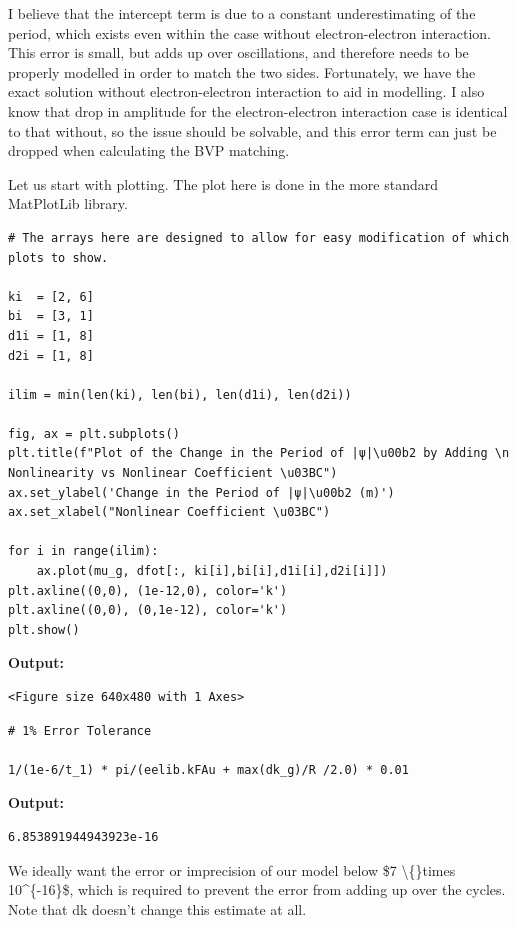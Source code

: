 \documentclass{article}
\begin{document}
I believe that the intercept term is due to a constant underestimating of the period, which exists even within the case without electron-electron interaction. This error is small, but adds up over oscillations, and therefore needs to be properly modelled in order to match the two sides. Fortunately, we have the exact solution without electron-electron interaction to aid in modelling. I also know that drop in amplitude for the electron-electron interaction case is identical to that without, so the issue should be solvable, and this error term can just be dropped when calculating the BVP matching.

Let us start with plotting. The plot here is done in the more standard MatPlotLib library.

\begin{lstlisting}
# The arrays here are designed to allow for easy modification of which plots to show.

ki  = [2, 6]
bi  = [3, 1]
d1i = [1, 8]
d2i = [1, 8]

ilim = min(len(ki), len(bi), len(d1i), len(d2i))

fig, ax = plt.subplots()
plt.title(f"Plot of the Change in the Period of |ψ|\u00b2 by Adding \n Nonlinearity vs Nonlinear Coefficient \u03BC")
ax.set_ylabel('Change in the Period of |ψ|\u00b2 (m)')
ax.set_xlabel("Nonlinear Coefficient \u03BC")

for i in range(ilim):
    ax.plot(mu_g, dfot[:, ki[i],bi[i],d1i[i],d2i[i]])
plt.axline((0,0), (1e-12,0), color='k')
plt.axline((0,0), (0,1e-12), color='k')
plt.show()\end{lstlisting}

\textbf{Output:}\begin{verbatim}
<Figure size 640x480 with 1 Axes>
\end{verbatim}

\begin{lstlisting}
# 1% Error Tolerance

1/(1e-6/t_1) * pi/(eelib.kFAu + max(dk_g)/R /2.0) * 0.01\end{lstlisting}

\textbf{Output:}\begin{verbatim}
6.853891944943923e-16
\end{verbatim}

We ideally want the error or imprecision of our model below \$7 \textbackslash\{\}times 10\textasciicircum{}\{-16\}\$, which is required to prevent the error from adding up over the cycles. Note that dk doesn't change this estimate at all.
\end{document}
